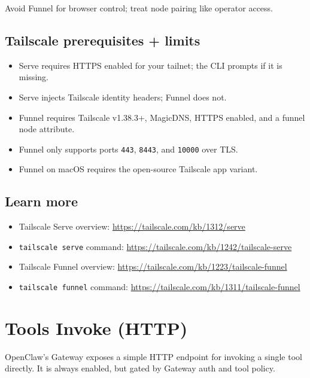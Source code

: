 Avoid Funnel for browser control; treat node pairing like operator access.

\subsection{Tailscale prerequisites + limits}


\begin{itemize}
  \item Serve requires HTTPS enabled for your tailnet; the CLI prompts if it is missing.
  \item Serve injects Tailscale identity headers; Funnel does not.
  \item Funnel requires Tailscale v1.38.3+, MagicDNS, HTTPS enabled, and a funnel node attribute.
  \item Funnel only supports ports \texttt{443}, \texttt{8443}, and \texttt{10000} over TLS.
  \item Funnel on macOS requires the open-source Tailscale app variant.
\end{itemize}


\subsection{Learn more}


\begin{itemize}
  \item Tailscale Serve overview: \href{https://tailscale.com/kb/1312/serve}{https://tailscale.com/kb/1312/serve}
  \item \texttt{tailscale serve} command: \href{https://tailscale.com/kb/1242/tailscale-serve}{https://tailscale.com/kb/1242/tailscale-serve}
  \item Tailscale Funnel overview: \href{https://tailscale.com/kb/1223/tailscale-funnel}{https://tailscale.com/kb/1223/tailscale-funnel}
  \item \texttt{tailscale funnel} command: \href{https://tailscale.com/kb/1311/tailscale-funnel}{https://tailscale.com/kb/1311/tailscale-funnel}
\end{itemize}



\clearpage

\section{Tools Invoke (HTTP)}


OpenClaw’s Gateway exposes a simple HTTP endpoint for invoking a single tool directly. It is always enabled, but gated by Gateway auth and tool policy.

